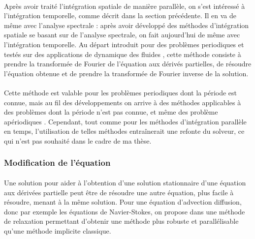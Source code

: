       \paragraph{}
      Après avoir traité l'intégration spatiale de manière parallèle, on s'est intéressé à l'intégration temporelle, comme décrit dans la section précédente.
      Il en va de même avec l'analyse spectrale : après avoir développé des méthodes d'intégration spatiale se basant sur de l'analyse spectrale, on fait aujourd'hui de même avec l'intégration temporelle.
      Au départ introduit pour des problèmes periodiques et testés sur des applications de dynamique des fluides \cite{GopinathJameson2005, GopinathJameson2006}, cette méthode consiste à prendre la transformée de Fourier de l'équation aux dérivés partielles, de résoudre l'équation obtenue et de prendre la transformée de Fourier inverse de la solution.

      \paragraph{}
      Cette méthode est valable pour les problèmes periodiques dont la période est connue, mais au fil des développements on arrive à des méthodes applicables à des problèmes dont la période n'est pas connue, et même des problème apériodiques \cite{EkiciDjeddiLiEtAl2020}.
      Cependant, tout comme pour les méthodes d'intégration parallèle en temps, l'utilisation de telles méthodes entraînerait une refonte du solveur, ce qui n'est pas souhaité dans le cadre de ma thèse.


    \subsubsection{Modification de l'équation}

      \paragraph{}
      Une solution pour aider à l'obtention d'une solution stationnaire d'une équation aux dérivées partielle peut être de résoudre une autre équation, plus facile à résoudre, menant à la même solution.
      Pour une équation d'advection diffusion, donc par exemple les équations de Navier-Stokes, on propose dans \cite{CouletteFranckHelluyEtAl2019} une méthode de relaxation permettant d'obtenir une méthode plus robuste et parallélisable qu'une méthode implicite classique.
